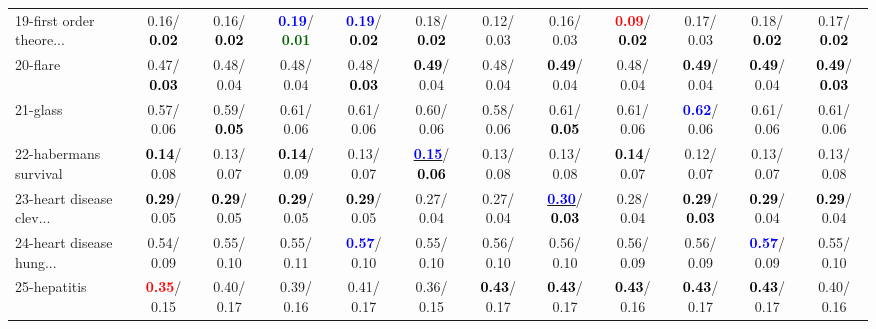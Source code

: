 \begin{table}[h]
\begin{center}
{\begin{tabular}{lc|c|c|c|c|c|c|c|c|c|c}
19-first order theore... &   0.16/\textcolor{black}{\textbf{  0.02}} &   0.16/\textcolor{black}{\textbf{  0.02}} & \textcolor{blue}{\textbf{  0.19}}/\textcolor{darkgreen}{\textbf{  0.01}} & \textcolor{blue}{\textbf{  0.19}}/\textcolor{black}{\textbf{  0.02}} &   0.18/\textcolor{black}{\textbf{  0.02}} &   0.12/  0.03 &   0.16/  0.03 & \textcolor{red}{\textbf{  0.09}}/\textcolor{black}{\textbf{  0.02}} &   0.17/  0.03 &   0.18/\textcolor{black}{\textbf{  0.02}} &   0.17/\textcolor{black}{\textbf{  0.02}} \\
20-flare &   0.47/\textcolor{black}{\textbf{  0.03}} &   0.48/  0.04 &   0.48/  0.04 &   0.48/\textcolor{black}{\textbf{  0.03}} & \textcolor{black}{\textbf{  0.49}}/  0.04 &   0.48/  0.04 & \textcolor{black}{\textbf{  0.49}}/  0.04 &   0.48/  0.04 & \textcolor{black}{\textbf{  0.49}}/  0.04 & \textcolor{black}{\textbf{  0.49}}/  0.04 & \textcolor{black}{\textbf{  0.49}}/\textcolor{black}{\textbf{  0.03}} \\
21-glass &   0.57/  0.06 &   0.59/\textcolor{black}{\textbf{  0.05}} &   0.61/  0.06 &   0.61/  0.06 &   0.60/  0.06 &   0.58/  0.06 &   0.61/\textcolor{black}{\textbf{  0.05}} &   0.61/  0.06 & \textcolor{blue}{\textbf{  0.62}}/  0.06 &   0.61/  0.06 &   0.61/  0.06 \\ \hline
22-habermans survival & \textcolor{black}{\textbf{  0.14}}/  0.08 &   0.13/  0.07 & \textcolor{black}{\textbf{  0.14}}/  0.09 &   0.13/  0.07 & \underline{\textcolor{blue}{\textbf{  0.15}}}/\textcolor{black}{\textbf{  0.06}} &   0.13/  0.08 &   0.13/  0.08 & \textcolor{black}{\textbf{  0.14}}/  0.07 &   0.12/  0.07 &   0.13/  0.07 &   0.13/  0.08 \\
23-heart disease clev... & \textcolor{black}{\textbf{  0.29}}/  0.05 & \textcolor{black}{\textbf{  0.29}}/  0.05 & \textcolor{black}{\textbf{  0.29}}/  0.05 & \textcolor{black}{\textbf{  0.29}}/  0.05 &   0.27/  0.04 &   0.27/  0.04 & \underline{\textcolor{blue}{\textbf{  0.30}}}/\textcolor{black}{\textbf{  0.03}} &   0.28/  0.04 & \textcolor{black}{\textbf{  0.29}}/\textcolor{black}{\textbf{  0.03}} & \textcolor{black}{\textbf{  0.29}}/  0.04 & \textcolor{black}{\textbf{  0.29}}/  0.04 \\
24-heart disease hung... &   0.54/  0.09 &   0.55/  0.10 &   0.55/  0.11 & \textcolor{blue}{\textbf{  0.57}}/  0.10 &   0.55/  0.10 &   0.56/  0.10 &   0.56/  0.10 &   0.56/  0.09 &   0.56/  0.09 & \textcolor{blue}{\textbf{  0.57}}/  0.09 &   0.55/  0.10 \\
25-hepatitis & \textcolor{red}{\textbf{  0.35}}/  0.15 &   0.40/  0.17 &   0.39/  0.16 &   0.41/  0.17 &   0.36/  0.15 & \textcolor{black}{\textbf{  0.43}}/  0.17 & \textcolor{black}{\textbf{  0.43}}/  0.17 & \textcolor{black}{\textbf{  0.43}}/  0.16 & \textcolor{black}{\textbf{  0.43}}/  0.17 & \textcolor{black}{\textbf{  0.43}}/  0.17 &   0.40/  0.16 \\

\end{tabular}}
\end{center}
\end{table}
